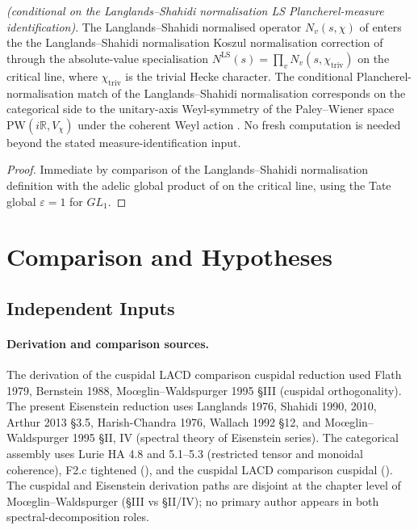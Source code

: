 \begin{proposition}
\label{v4-arith:w6-d:prop:W6C-crossref}
\ClaimStatusProvedHereConditional \emph{(conditional on the Langlands--Shahidi normalisation LS
Plancherel-measure identification)}. The Langlands--Shahidi normalised operator
\(N_{v}(s,\chi)\) of  enters the
the Langlands--Shahidi normalisation Koszul normalisation correction of 
through the absolute-value specialisation
\(N^{\mathrm{LS}}(s)=\prod_{v}N_{v}(s,\chi_{\mathrm{triv}})\)
on the critical line, where \(\chi_{\mathrm{triv}}\) is the
trivial Hecke character. The conditional Plancherel-normalisation
match of the Langlands--Shahidi normalisation corresponds on the categorical side to the
unitary-axis Weyl-symmetry of the Paley--Wiener space
\(\mathrm{PW}(i\mathbb{R},V_{\chi})\) under the coherent Weyl
action . No fresh
computation is needed beyond the stated measure-identification input.
\end{proposition}

\begin{proof}
Immediate by comparison of the Langlands--Shahidi normalisation definition
 with the adelic global product
of  on the critical line,
using the Tate global \(\varepsilon=1\) for \(GL_{1}\).
\end{proof}

\section{Comparison and Hypotheses}
\label{v4-arith:w6-d:source-comparison}

\subsection{Independent Inputs}

\paragraph{Derivation and comparison sources.}
The derivation of the cuspidal LACD comparison cuspidal reduction used Flath 1979,
Bernstein 1988, Mo{\oe}glin--Waldspurger 1995 \S III (cuspidal
orthogonality). The present Eisenstein reduction uses Langlands 1976,
Shahidi 1990, 2010, Arthur 2013 \S 3.5, Harish-Chandra 1976,
Wallach 1992 \S 12, and Mo{\oe}glin--Waldspurger 1995 \S II, IV
(spectral theory of Eisenstein series). The categorical assembly
uses Lurie HA 4.8 and 5.1--5.3 (restricted tensor and monoidal
coherence), F2.c tightened (),
and the cuspidal LACD comparison cuspidal ().
The cuspidal and Eisenstein derivation paths are disjoint at the
chapter level of Mo{\oe}glin--Waldspurger (\S III vs \S II/IV);
no primary author appears in both spectral-decomposition roles.

